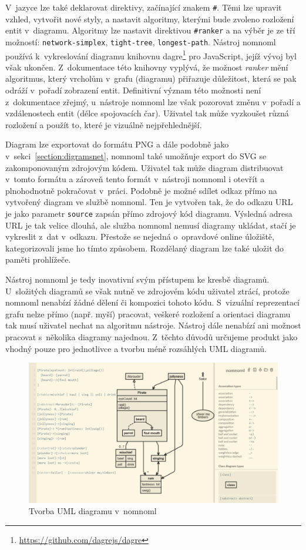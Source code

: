 V~jazyce lze také deklarovat direktivy, začínající znakem \texttt{\#}. Těmi lze
upravit vzhled, vytvořit nové styly, a nastavit algoritmy, kterými bude zvoleno
rozložení entit v~diagramu. Algoritmy lze nastavit direktivou \texttt{\#ranker}
a na výběr je ze tří možností: \texttt{network-simplex}, \texttt{tight-tree},
\texttt{longest-path}. Nástroj nomnoml používá k~vykreslování diagramu knihovnu
dagre\footnote{\url{https://github.com/dagrejs/dagre}} pro JavaScript, jejíž
vývoj byl však ukončen. Z~dokumentace této knihovny vyplývá, že možnost
\emph{ranker} mění algoritmus, který vrcholům v~grafu (diagramu) přiřazuje
důležitost, která se pak odráží v~pořadí zobrazení entit. Definitivní význam
této možnosti není z~dokumentace zřejmý, u~nástroje nomnoml lze však pozorovat
změnu v~pořadí a vzdálenostech entit (délce spojovacích čar). Uživatel tak může
vyzkoušet různá rozložení a použít to, které je vizuálně nejpřehlednější.

Diagram lze exportovat do formátu PNG a dále podobně jako v~sekci~\ref{section:digramsnet}, nomnoml také umožňuje export do SVG se zakomponovaným zdrojovým kódem.
Uživatel tak může diagram distribuovat v~tomto formátu a zároveň tento formát v~nástroji nomnoml i otevřít a plnohodnotně pokračovat v~práci.
Podobně je možné sdílet odkaz přímo na vytvořený diagram ve službě nomnoml.
Ten je vytvořen tak, že do odkazu URL je jako parametr \texttt{source} zapsán přímo zdrojový kód diagramu.
Výsledná adresa URL je tak velice dlouhá, ale služba nomnoml nemusí diagramy ukládat, stačí je vykreslit z~dat v~odkazu.
Přestože se nejedná o~opravdové online úložiště, kategorizovali jsme ho tímto způsobem.
Rozdělaný diagram lze také uložit do paměti prohlížeče.

Nástroj nomnoml je tedy inovativní svým přístupem ke kresbě diagramů.
U~složitých diagramů se však nutně ve zdrojovém kódu uživatel ztrácí, protože
nomnoml nenabízí žádné dělení či kompozici tohoto kódu. S~vizuální reprezentací
grafu nelze přímo (např. myší) pracovat, veškeré rozložení a orientaci diagramu
tak musí uživatel nechat na algoritmu nástroje. Nástroj dále nenabízí ani
možnost pracovat s~několika diagramy najednou. Z~těchto důvodů určujeme produkt
jako vhodný pouze pro jednotlivce a tvorbu méně rozsáhlých UML diagramů.

\begin{figure}
  \centering
  \includegraphics[width = \textwidth]{../img/nomnoml.png}
  \caption{Tvorba UML diagramu v~nomnoml}
  \label{fig:nomnoml}
\end{figure}

